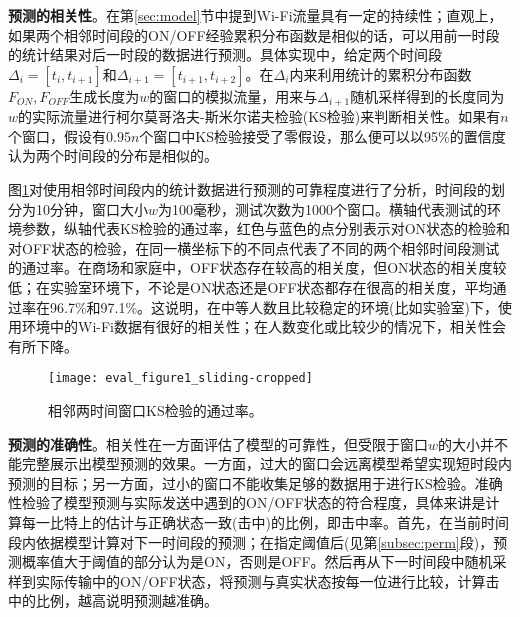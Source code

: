 \textbf{预测的相关性}。在第\ref{sec:model}节中提到Wi-Fi流量具有一定的持续性；直观上，如果两个相邻时间段的ON/OFF经验累积分布函数是相似的话，可以用前一时段的统计结果对后一时段的数据进行预测。具体实现中，给定两个时间段$\Delta_i = [t_i, t_{i+1}]$和$\Delta_{i+1} = [t_{i+1}, t_{i+2}]$。在$\Delta_i$内来利用统计的累积分布函数$F_{ON},F_{OFF}$生成长度为$w$的窗口的模拟流量，用来与$\Delta_{i+1}$随机采样得到的长度同为$w$的实际流量进行柯尔莫哥洛夫-斯米尔诺夫检验(KS检验)来判断相关性。如果有$n$个窗口，假设有$0.95n$个窗口中KS检验接受了零假设，那么便可以以95\%的置信度认为两个时间段的分布是相似的。

图\ref{fig:kstest}对使用相邻时间段内的统计数据进行预测的可靠程度进行了分析，时间段的划分为10分钟，窗口大小$w$为100毫秒，测试次数为1000个窗口。横轴代表测试的环境参数，纵轴代表KS检验的通过率，红色与蓝色的点分别表示对ON状态的检验和对OFF状态的检验，在同一横坐标下的不同点代表了不同的两个相邻时间段测试的通过率。在商场和家庭中，OFF状态存在较高的相关度，但ON状态的相关度较低；在实验室环境下，不论是ON状态还是OFF状态都存在很高的相关度，平均通过率在96.7\%和97.1\%。这说明，在中等人数且比较稳定的环境(比如实验室)下，使用环境中的Wi-Fi数据有很好的相关性；在人数变化或比较少的情况下，相关性会有所下降。
\begin{figure}[t]
	\centering
	\texttt{[image: eval\_figure1\_sliding-cropped]}
	\caption{相邻两时间窗口KS检验的通过率。}
	\label{fig:kstest}
\end{figure}

\textbf{预测的准确性}。相关性在一方面评估了模型的可靠性，但受限于窗口$w$的大小并不能完整展示出模型预测的效果。一方面，过大的窗口会远离模型希望实现短时段内预测的目标；另一方面，过小的窗口不能收集足够的数据用于进行KS检验。准确性检验了模型预测与实际发送中遇到的ON/OFF状态的符合程度，具体来讲是计算每一比特上的估计与正确状态一致(击中)的比例，即击中率。首先，在当前时间段内依据模型计算对下一时间段的预测；在指定阈值后(见第\ref{subsec:perm}段)，预测概率值大于阈值的部分认为是ON，否则是OFF。然后再从下一时间段中随机采样到实际传输中的ON/OFF状态，将预测与真实状态按每一位进行比较，计算击中的比例，越高说明预测越准确。


